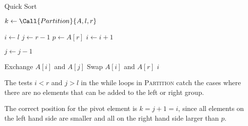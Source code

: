 \begin{algorithm}
    \begin{spacing}{1.2}
        \caption{Quick Sort}
        \begin{algorithmic}[1]
                    \State $k \gets \Call{Partition}{A, l, r}$
                    \State {} 
                    \State {} 
                \EndIf
            \EndProcedure

                \State $i \gets l$
                \State $j \gets r - 1$
                \State $p \gets A[r]$
                 
                        \State $i \gets i + 1$ 
                    \EndWhile

                        \State $j \gets j - 1$ 
                    \EndWhile

                        \State Exchange $A[i]$ and $A[j]$
                    \EndIf
                \EndWhile
                \State Swap $A[i]$ and $A[r]$ 
                \State \Return $i$
            \EndProcedure
        \end{algorithmic}
    \end{spacing}
\end{algorithm}

The tests $i < r$ and $j > l$ in the while loops in \textsc{Partition} catch the cases where there are no elements that can be added to the left or right group.

The correct position for the pivot element is $k = j + 1 = i$, since all elements on the left hand side are smaller and all on the right hand side larger than $p$.
